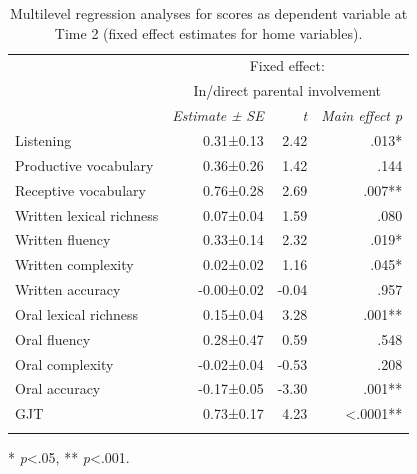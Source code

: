 \documentclass[output=paper,modfonts,nonflat,newtxmath]{langsci/langscibook}
\begin{document}
\begin{paperappendix}
\begin{table}
	\caption{\label{tab:pfenninger:19} Multilevel regression analyses for scores as dependent variable at Time 2 (fixed effect estimates for home variables).}
	\begin{tabularx}{0.85\textwidth}{l rrr}
		\lsptoprule
		& \multicolumn{3}{c}{Fixed effect:}\\
		& \multicolumn{3}{c}{In/direct parental involvement}\\
		\cmidrule{2-4}
		& \textit{Estimate} \textit{±} \textit{SE} & \textit{t}  & \textit{Main effect p}\\
		\midrule
		Listening & 0.31±0.13 & 2.42 & .013* \\
		Productive vocabulary & 0.36±0.26 & 1.42 & .144 \\
		Receptive vocabulary & 0.76±0.28 & 2.69 & .007** \\
		Written lexical richness & 0.07±0.04 & 1.59 & .080 \\
		Written fluency & 0.33±0.14 & 2.32 & .019* \\
		Written complexity & 0.02±0.02 & 1.16 & .045* \\
		Written accuracy & -0.00±0.02 & -0.04 & .957 \\
		Oral lexical richness & 0.15±0.04 & 3.28 & .001**\\
		Oral fluency & 0.28±0.47 & 0.59 & .548 \\
		Oral complexity & -0.02±0.04 & -0.53 & .208 \\
		Oral accuracy & -0.17±0.05 & -3.30 & .001** \\
		GJT & 0.73±0.17 & 4.23 & <.0001** \\
		\lspbottomrule
	\end{tabularx}

	* \textit{p}<.05, ** \textit{p}<.001.
\end{table}


\clearpage
\end{paperappendix}
\sloppy\printbibliography[heading=subbibliography,notkeyword=this]
\end{document}
